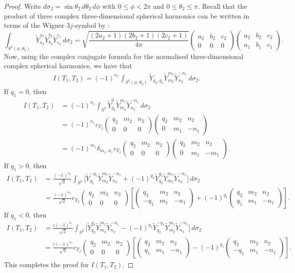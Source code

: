 \documentclass[11pt]{amsart}
\theoremstyle{definition}
\theoremstyle{plain}
\theoremstyle{remark}
\newcommand{\mat}[6]{\begin{pmatrix} #1 & #2 & #3 \\ #4 & #5 & #6 \end{pmatrix}}
\begin{document}
\begin{proof} 
Write $d\sigma_2 = \sin\theta_2\, d\theta_2\, d\phi$ with $0\le \phi < 2\pi$ and $0\le \theta_2\le \pi$. Recall that the product of three complex three-dimensional spherical harmonics can be written in terms of the Wigner $3j$-symbol by \cite[Eq.~34.3.22]{NIST}: 
\begin{equation*} 
\int_{S^2(\phi, \theta_2)} \widetilde Y_{a_2}^{a_1}\widetilde Y_{b_2}^{b_1}\widetilde Y_{c_2}^{c_1}\, d\sigma_2 = \sqrt{\frac{(2a_2 + 1)(2b_2 + 1)(2c_2 + 1)}{4\pi}}\mat{a_2}{b_2}{c_2}{0}{0}{0}\mat{a_2}{b_2}{c_2}{a_1}{b_1}{c_1}. 
\end{equation*} 
Now, using the complex conjugate formula for the normalised three-dimensional complex spherical harmonics, we have that 
\begin{align*} 
I(T_1, T_2) = (-1)^{n_1}\int_{S^2(\phi, \theta_2)} \widetilde Y_{q_2, q_1}\widetilde Y_{m_2}^{m_1}\widetilde Y_{n_2}^{-n_1}\, d\sigma_2. 
\end{align*} 
If $q_1 = 0$, then 
\begin{align*} 
I(T_1, T_2) & = (-1)^{n_1}\int_{S^2} \widetilde Y_{q_2}^0\widetilde Y_{m_2}^{m_1}\widetilde Y_{n_2}^{-n_1}\, d\sigma_2 \\ 
& = (-1)^{n_1}c_{T_2}\mat{q_2}{m_2}{n_2}{0}{0}{0}\mat{q_2}{m_2}{n_2}{0}{m_1}{-n_1} \\ 
& = (-1)^{m_1}\delta_{m_1, n_1}c_{T_2}\mat{q_2}{m_2}{n_2}{0}{0}{0}\mat{q_2}{m_2}{n_2}{0}{m_1}{-m_1}. 
\end{align*} 
If $q_1 > 0$, then 
\begin{align*} 
I(T_1, T_2) & = \frac{(-1)^{n_1}}{\sqrt{2}}\int_{S^2} \Big[\widetilde Y_{q_2}^{-q_1}\widetilde Y_{m_2}^{m_1}\widetilde Y_{n_2}^{-n_1} + (-1)^{q_1}\widetilde Y_{q_2}^{q_1}\widetilde Y_{m_2}^{m_1}\widetilde Y_{n_2}^{-n_1}\Big]\, d\sigma_2 \\ 
& = \frac{(-1)^{n_1}}{\sqrt{2}}c_{T_2}\mat{q_2}{m_2}{n_2}{0}{0}{0}\left[\mat{q_2}{m_2}{n_2}{-q_1}{m_1}{-n_1} + (-1)^{q_1}\mat{q_2}{m_2}{n_2}{q_1}{m_1}{-n_1}\right]. 
\end{align*} 
If $q_1 < 0$, then 
\begin{align*} 
I(T_1, T_2) & = \frac{i(-1)^{n_1}}{\sqrt{2}}\int_{S^2} \Big[\widetilde Y_{q_2}^{q_1}\widetilde Y_{m_2}^{m_1}\widetilde Y_{n_2}^{-n_1} - (-1)^{q_1}\widetilde Y_{q_2}^{-q_1}\widetilde Y_{m_2}^{m_1}\widetilde Y_{n_2}^{-n_1}\Big]\, d\sigma_2 \\ 
& = \frac{i(-1)^{n_1}}{\sqrt{2}}c_{T_2}\mat{q_2}{m_2}{n_2}{0}{0}{0}\left[\mat{q_2}{m_2}{n_2}{q_1}{m_1}{-n_1} - (-1)^{q_1}\mat{q_2}{m_2}{n_2}{-q_1}{m_1}{-n_1}\right]. 
\end{align*} 
This completes the proof for $I(T_1, T_2)$. 


\end{proof}
\end{document}
